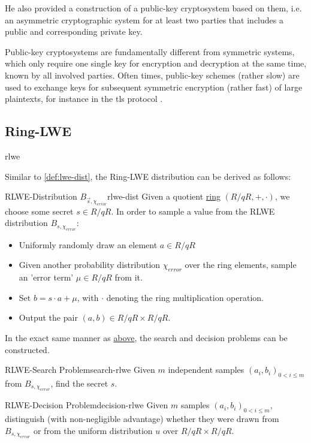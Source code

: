 He also provided a construction of a public-key cryptosystem based on them, i.e. an asymmetric cryptographic
system for at least two parties that includes a public and corresponding private key.

Public-key cryptosystems are fundamentally different from symmetric systems, which only
require one single key for encryption and decryption at the same time, known by all involved parties.
Often times, public-key schemes (rather slow) are used to exchange keys for subsequent symmetric encryption
(rather fast) of large plaintexts, for instance in the \gls{tls} protocol \parencite{rfc8446}.

\subsection{Ring-LWE}
\Gls{rlwe}
\cite{2010-rlwe-original}

Similar to \autoref{def:lwe-dist}, the Ring-LWE distribution can be derived as follows:

\begin{corollary}{RLWE-Distribution $B_{\vec{s}, \chi_{error}}$}{rlwe-dist}
  Given a quotient \hyperref[def:ring]{ring} $(R/qR, +, \cdot)$, we choose some secret $s \in R/qR$.
  In order to sample a value from the RLWE distribution $B_{s, \chi_{error}}$:
  \begin{itemize}
    \item Uniformly randomly draw an element $a \in R/qR$
    \item Given another probability distribution $\chi_{error}$ over the ring elements,
          sample an 'error term' $\mu \in R/qR$ from it.
    \item Set $b = s \cdot a + \mu$, with $\cdot$ denoting the ring multiplication operation.
    \item Output the pair $(a, b) \in R/qR \times R/qR$.
  \end{itemize}
\end{corollary}

In the exact same manner as \hyperref[subsec:lwe]{above}, the search and decision problems
can be constructed.

\begin{corollary}{RLWE-Search Problem}{search-rlwe}
  Given $m$ independent samples $(a_i, b_i)_{0 < i \leq m}$ from $B_{s, \chi_{error}}$, find the secret $s$.
\end{corollary}
\begin{corollary}{RLWE-Decision Problem}{decision-rlwe}
  Given $m$ samples $(a_i, b_i)_{0 < i \leq m}$, distinguish (with non-negligible advantage)
  whether they were drawn from $B_{s, \chi_{error}}$ or from the uniform distribution
  $u$ over $R/qR \times R/qR$.
\end{corollary}

